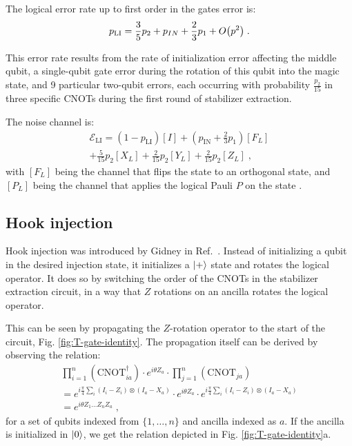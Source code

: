 \documentclass[twocolumn,
notitlepage,
aps,
prx,
floatfix,
superscriptaddress
]{revtex4-2}
\begin{document}
The logical error rate up to first order in the gates error is:
\begin{align}
    p_{\text{LI}} = \frac{3}{5} p_2 + p_{IN} + \frac{2}{3} p_1 + O\qty(p^2) \;.
\end{align}

This error rate results from the rate of initialization error affecting the middle qubit, a single-qubit gate error during the rotation of this qubit into the magic state, and 9 particular two-qubit errors, each occurring with probability $\frac{p_2}{15}$ in three specific CNOTs during the first round of stabilizer extraction.

The noise channel is:
\begin{multline}
    \mathcal{E}_\text{LI}  = (1-p_\text{LI}) [I] + (p_\text{IN} + \frac{2}{3} p_1) [F_L]
    \\
    + \frac{5}{15} p_2 [X_L] + \frac{2}{15} p_2 [Y_L] + \frac{2}{15} p_2 [Z_L] \;,
\end{multline}
with $[F_L]$ being the channel that flips the state to an orthogonal state, and $[P_L]$ being the channel that applies the logical Pauli $P$ on the state \cite{li2015magic}.

\subsection{Hook injection} \label{sec:hook-inject-appendix}



Hook injection was introduced by Gidney in Ref.~\cite{gidney_hook_injection}. Instead of initializing a qubit in the desired injection state, it initializes a $\ket{+}$ state and rotates the logical operator. It does so by switching the order of the CNOTs in the stabilizer extraction circuit, in a way that $Z$ rotations on an ancilla rotates the logical operator. 

This can be seen by propagating the $Z$-rotation operator to the start of the circuit, Fig. \ref{fig:T-gate-identity}.
The propagation itself can be derived by observing the relation:
\begin{multline} \label{eq:rotation_identity}
    \prod_{i=1}^n (\text{CNOT}_{ia}^\dagger) \cdot e^{i \theta Z_a} \cdot \prod_{j=1}^n (\text{CNOT}_{ja}) 
    \\
    = e^{i \frac{\pi}{4} \sum_i(I_i-Z_i)\otimes (I_a-X_a)}
    \cdot e^{i \theta Z_a}
    \cdot e^{i \frac{\pi}{4} \sum_i(I_i-Z_i) \otimes (I_a-X_a)}
    \\
    = e^{i\theta Z_1 \dots Z_n Z_a} \;,
\end{multline}
for a set of qubits indexed from $\{1,\dots,n\}$ and ancilla indexed as $a$. 
If the ancilla is initialized in $\ket{0}$, we get the relation depicted in Fig. \ref{fig:T-gate-identity}a.
\end{document}

